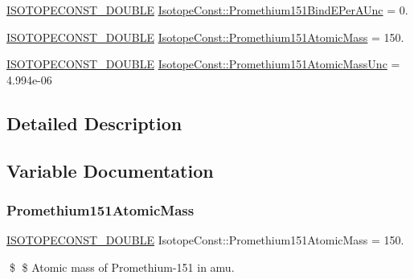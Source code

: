 \begin{DoxyCompactItemize}
\mbox{\hyperlink{group___isotope_const-_macros_ga8f45a7272ce02c0b4c65c44636ed719a}{I\+S\+O\+T\+O\+P\+E\+C\+O\+N\+S\+T\+\_\+\+D\+O\+U\+B\+LE}} \mbox{\hyperlink{group___isotope_const-_promethium-_pm151_gacae7284399cf48d39f7fff9db0a21057}{Isotope\+Const\+::\+Promethium151\+Bind\+E\+Per\+A\+Unc}} = 0.
\item 
\mbox{\hyperlink{group___isotope_const-_macros_ga8f45a7272ce02c0b4c65c44636ed719a}{I\+S\+O\+T\+O\+P\+E\+C\+O\+N\+S\+T\+\_\+\+D\+O\+U\+B\+LE}} \mbox{\hyperlink{group___isotope_const-_promethium-_pm151_ga6f42b9f845c55d661aa305e587a0f40d}{Isotope\+Const\+::\+Promethium151\+Atomic\+Mass}} = 150.
\item 
\mbox{\hyperlink{group___isotope_const-_macros_ga8f45a7272ce02c0b4c65c44636ed719a}{I\+S\+O\+T\+O\+P\+E\+C\+O\+N\+S\+T\+\_\+\+D\+O\+U\+B\+LE}} \mbox{\hyperlink{group___isotope_const-_promethium-_pm151_ga5cba5c18fe95eccc932fb1d3d68dc63d}{Isotope\+Const\+::\+Promethium151\+Atomic\+Mass\+Unc}} = 4.\+994e-\/06
\end{DoxyCompactItemize}


\subsection{Detailed Description}


\subsection{Variable Documentation}
\mbox{\label{group___isotope_const-_promethium-_pm151_ga6f42b9f845c55d661aa305e587a0f40d}} 
\subsubsection{\texorpdfstring{Promethium151\+Atomic\+Mass}{Promethium151AtomicMass}}
{\footnotesize\ttfamily \mbox{\hyperlink{group___isotope_const-_macros_ga8f45a7272ce02c0b4c65c44636ed719a}{I\+S\+O\+T\+O\+P\+E\+C\+O\+N\+S\+T\+\_\+\+D\+O\+U\+B\+LE}} Isotope\+Const\+::\+Promethium151\+Atomic\+Mass = 150.}

\$ \$ Atomic mass of Promethium-\/151 in amu. \mbox{\label{group___isotope_const-_promethium-_pm151_ga5cba5c18fe95eccc932fb1d3d68dc63d}} 
